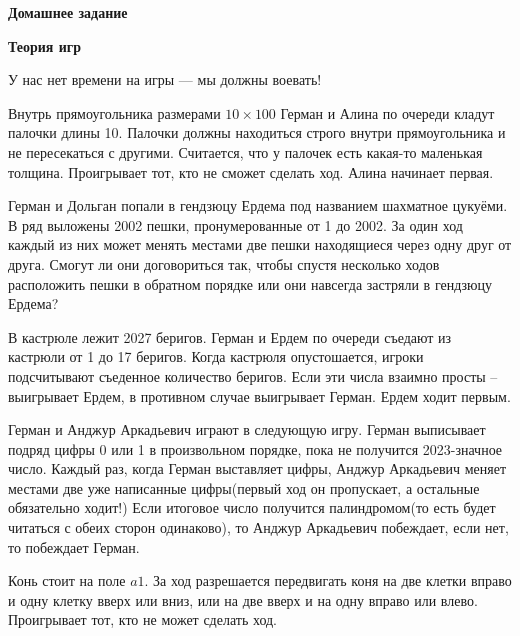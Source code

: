 \centerline{\bf \Huge Домашнее задание}
\centerline{\bf \Huge Теория игр}

\begin{flushright}
        \scriptsize{У нас нет времени на игры --- мы должны воевать!}
\end{flushright}

 Внутрь прямоугольника размерами $10\times100$ Герман и Алина по очереди кладут палочки длины 10. Палочки должны находиться строго внутри прямоугольника и не пересекаться с другими. Считается, что у палочек есть какая-то маленькая толщина. Проигрывает тот, кто не сможет сделать ход. Алина начинает первая.

 Герман и Дольган попали в гендзюцу Ердема под названием шахматное цукуёми. В ряд выложены 2002 пешки, пронумерованные от 1 до 2002. За один ход каждый из них может менять местами две пешки находящиеся через одну друг от друга. Смогут ли они договориться так, чтобы спустя несколько ходов расположить пешки в обратном порядке или они навсегда застряли в гендзюцу Ердема?

 В кастрюле лежит 2027 беригов. Герман и Ердем по очереди съедают из кастрюли от 1 до 17 беригов. Когда кастрюля опустошается, игроки подсчитывают съеденное количество беригов. Если эти числа взаимно просты – выигрывает Ердем, в противном случае выигрывает Герман. Ердем ходит первым.

 Герман и Анджур Аркадьевич играют в следующую игру. Герман выписывает подряд цифры 0 или 1 в произвольном порядке, пока не получится 2023-значное число. Каждый раз, когда Герман выставляет цифры, Анджур Аркадьевич меняет местами две уже написанные цифры(первый ход он пропускает, а остальные обязательно ходит!) Если итоговое число получится палиндромом(то есть будет читаться с обеих сторон одинаково), то Анджур Аркадьевич побеждает, если нет, то побеждает Герман.

 Конь стоит на поле $a1$. За ход разрешается передвигать коня на две клетки вправо и одну клетку вверх или вниз, или на две вверх и на одну вправо или влево. Проигрывает тот, кто не может сделать ход.